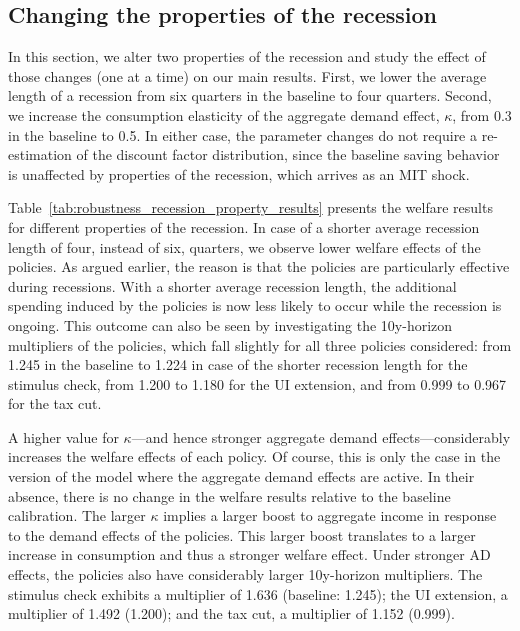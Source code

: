 \documentclass{econsocart}
\begin{document}
\FloatBarrier
\hypertarget{changing-the-properties-of-the-recession}{}\par\subsection*{Changing the properties of the recession}

In this section, we alter two properties of the recession and study the effect of those changes (one at a time) on our main results.
First, we lower the average length of a recession from six quarters in the baseline to four quarters.
Second, we increase the consumption elasticity of the aggregate demand effect, $\kappa$, from 0.3 in the baseline to 0.5.
In either case, the parameter changes do not require a re-estimation of the discount factor distribution, since the baseline saving behavior is unaffected by properties of the recession, which arrives as an MIT shock.

Table~\ref{tab:robustness_recession_property_results} presents the welfare results for different properties of the recession.
In case of a shorter average recession length of four, instead of six, quarters, we observe lower welfare effects of the policies.
As argued earlier, the reason is that the policies are particularly effective during recessions.
With a shorter average recession length, the additional spending induced by the policies is now less likely to occur while the recession is ongoing.
This outcome can also be seen by investigating the 10y-horizon multipliers of the policies, which fall slightly for all three policies considered: from 1.245 in the baseline to 1.224 in case of the shorter recession length for the stimulus check, from 1.200 to 1.180 for the UI extension, and from 0.999 to 0.967 for the tax cut.

A higher value for $\kappa$---and hence stronger aggregate demand effects---considerably increases the welfare effects of each policy.
Of course, this is only the case in the version of the model where the aggregate demand effects are active.
In their absence, there is no change in the welfare results relative to the baseline calibration.
The larger $\kappa$ implies a larger boost to aggregate income in response to the demand effects of the policies.
This larger boost translates to a larger increase in consumption and thus a stronger welfare effect.
Under stronger AD effects, the policies also have considerably larger 10y-horizon multipliers.
The stimulus check exhibits a multiplier of 1.636 (baseline: 1.245); the UI extension, a multiplier of 1.492 (1.200); and the tax cut, a multiplier of 1.152 (0.999).
\end{document}
